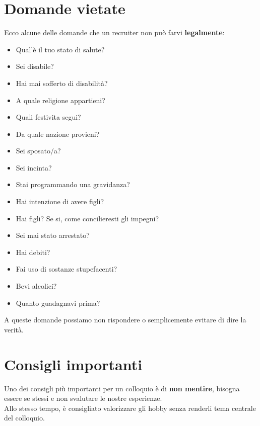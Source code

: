 \documentclass[12pt,a4paper]{article}
\let\oldsection\section
\renewcommand{\section}{\clearpage\oldsection}
\begin{document}
\section{Domande vietate}
Ecco alcune delle domande che un recruiter non può farvi \textbf{legalmente}:
\begin{itemize}
    \item Qual'è il tuo stato di salute?
    \item Sei disabile?
    \item Hai mai sofferto di disabilità?
    \item A quale religione appartieni?
    \item Quali festivita segui?
    \item Da quale nazione provieni?
    \item Sei sposato/a?
    \item Sei incinta?
    \item Stai programmando una gravidanza?
    \item Hai intenzione di avere figli?
    \item Hai figli? Se si, come concilieresti gli impegni?
    \item Sei mai stato arrestato?
    \item Hai debiti?
    \item Fai uso di sostanze stupefacenti?
    \item Bevi alcolici?
    \item Quanto guadagnavi prima?
\end{itemize}
A queste domande possiamo non rispondere o semplicemente evitare di dire la verità.

\section{Consigli importanti}
Uno dei consigli più importanti per un colloquio è di \textbf{non mentire}, bisogna essere se stessi e non svalutare le nostre esperienze.\\
Allo stesso tempo, è consigliato valorizzare gli hobby senza renderli tema centrale del colloquio.
\end{document}
